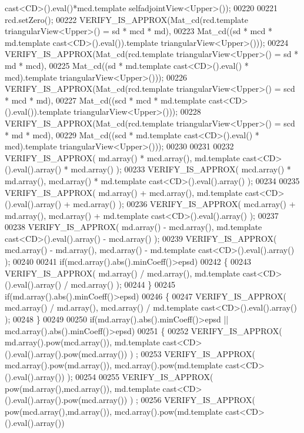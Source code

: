 \begin{DoxyCode}
{       cast<CD>().eval()*mcd.template selfadjointView<Upper>());}
00220 
00221   rcd.setZero();
00222   VERIFY\_IS\_APPROX(Mat\_cd(rcd.template triangularView<Upper>() = sd * mcd * md),
00223                    Mat\_cd((sd * mcd * md.template cast<CD>().eval()).\textcolor{keyword}{template} triangularView<Upper>()));
00224   VERIFY\_IS\_APPROX(Mat\_cd(rcd.template triangularView<Upper>() = sd * md * mcd),
00225                    Mat\_cd((sd * md.template cast<CD>().eval() * mcd).\textcolor{keyword}{template} triangularView<Upper>()));
00226   VERIFY\_IS\_APPROX(Mat\_cd(rcd.template triangularView<Upper>() = scd * mcd * md),
00227                    Mat\_cd((scd * mcd * md.template cast<CD>().eval()).\textcolor{keyword}{template} triangularView<Upper>()));
00228   VERIFY\_IS\_APPROX(Mat\_cd(rcd.template triangularView<Upper>() = scd * md * mcd),
00229                    Mat\_cd((scd * md.template cast<CD>().eval() * mcd).\textcolor{keyword}{template} triangularView<Upper>()));
00230 
00231 
00232   VERIFY\_IS\_APPROX( md.array()  * mcd.array(), md.template cast<CD>().eval().array() * mcd.array() );
00233   VERIFY\_IS\_APPROX( mcd.array() * md.array(),  mcd.array() * md.template cast<CD>().eval().array() );
00234 
00235   VERIFY\_IS\_APPROX( md.array()  + mcd.array(), md.template cast<CD>().eval().array() + mcd.array() );
00236   VERIFY\_IS\_APPROX( mcd.array() + md.array(),  mcd.array() + md.template cast<CD>().eval().array() );
00237 
00238   VERIFY\_IS\_APPROX( md.array()  - mcd.array(), md.template cast<CD>().eval().array() - mcd.array() );
00239   VERIFY\_IS\_APPROX( mcd.array() - md.array(),  mcd.array() - md.template cast<CD>().eval().array() );
00240 
00241   \textcolor{keywordflow}{if}(mcd.array().abs().minCoeff()>epsd)
00242   \{
00243     VERIFY\_IS\_APPROX( md.array() / mcd.array(), md.template cast<CD>().eval().array() / mcd.array() );
00244   \}
00245   \textcolor{keywordflow}{if}(md.array().abs().minCoeff()>epsd)
00246   \{
00247     VERIFY\_IS\_APPROX( mcd.array() / md.array(), mcd.array() / md.template cast<CD>().eval().array() );
00248   \}
00249 
00250   \textcolor{keywordflow}{if}(md.array().abs().minCoeff()>epsd || mcd.array().abs().minCoeff()>epsd)
00251   \{
00252     VERIFY\_IS\_APPROX( md.array().pow(mcd.array()), md.template cast<CD>().eval().array().pow(mcd.array()) )
      ;
00253     VERIFY\_IS\_APPROX( mcd.array().pow(md.array()),  mcd.array().pow(md.template cast<CD>().eval().array()) 
      );
00254 
00255     VERIFY\_IS\_APPROX( pow(md.array(),mcd.array()), md.template cast<CD>().eval().array().pow(mcd.array()) )
      ;
00256     VERIFY\_IS\_APPROX( pow(mcd.array(),md.array()),  mcd.array().pow(md.template cast<CD>().eval().array()) 

\end{DoxyCode}
